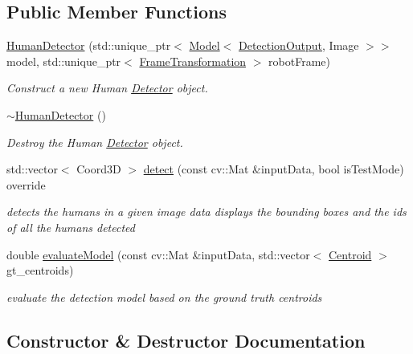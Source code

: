 \subsection*{Public Member Functions}
\begin{DoxyCompactItemize}
\item 
\hyperlink{classHumanDetector_ad24009d2c6d212e037ee2ae46a9b9c05}{Human\+Detector} (std\+::unique\+\_\+ptr$<$ \hyperlink{classModel}{Model}$<$ \hyperlink{classData}{Detection\+Output}, Image $>$$>$ model, std\+::unique\+\_\+ptr$<$ \hyperlink{classFrameTransformation}{Frame\+Transformation} $>$ robot\+Frame)
\begin{DoxyCompactList}\small\item\em Construct a new Human \hyperlink{classDetector}{Detector} object. \end{DoxyCompactList}\item 
\mbox{\label{classHumanDetector_a14a3f12c65510640240522c9e064b5f6}} 
\hyperlink{classHumanDetector_a14a3f12c65510640240522c9e064b5f6}{$\sim$\+Human\+Detector} ()
\begin{DoxyCompactList}\small\item\em Destroy the Human \hyperlink{classDetector}{Detector} object. \end{DoxyCompactList}\item 
std\+::vector$<$ Coord3D $>$ \hyperlink{classHumanDetector_ad6939ac83173d50f4420eae30ff3f978}{detect} (const cv\+::\+Mat \&input\+Data, bool is\+Test\+Mode) override
\begin{DoxyCompactList}\small\item\em detects the humans in a given image data displays the bounding boxes and the ids of all the humans detected \end{DoxyCompactList}\item 
double \hyperlink{classHumanDetector_af24d889a9b48029f405a0e6c105b898a}{evaluate\+Model} (const cv\+::\+Mat \&input\+Data, std\+::vector$<$ \hyperlink{structCentroid}{Centroid} $>$ gt\+\_\+centroids)
\begin{DoxyCompactList}\small\item\em evaluate the detection model based on the ground truth centroids \end{DoxyCompactList}\end{DoxyCompactItemize}


\subsection{Constructor \& Destructor Documentation}
\mbox{\label{classHumanDetector_ad24009d2c6d212e037ee2ae46a9b9c05}} 
